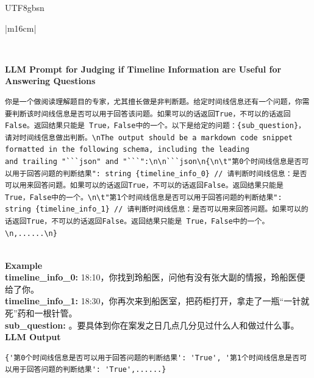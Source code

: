 \documentclass[11pt]{article}
\begin{document}
{\begin{CJK}{UTF8}{gbsn}
\begin{table}[ht!]
\begin{minipage}{\textwidth}
\begin{tabular}{|m{16cm}|}
\begin{minipage}[t]{\linewidth}
\begin{verbatim}
\end{verbatim}
\end{minipage} \\
\hline
{}  {\textbf{LLM Prompt for Judging if Timeline Information are Useful for Answering Questions}} \\
\begin{minipage}[t]{\linewidth}
\small\begin{verbatim}
你是一个做阅读理解题目的专家，尤其擅长做是非判断题。给定时间线信息还有一个问题，你需要判断该时间线信息是否可以用于回答该问题。如果可以的话返回True，不可以的话返回False。返回结果只能是 True，False中的一个。以下是给定的问题：{sub_question}，请对时间线信息做出判断。\nThe output should be a markdown code snippet formatted in the following schema, including the leading
and trailing "```json" and "```":\n\n```json\n{\n\t"第0个时间线信息是否可以用于回答问题的判断结果": string {timeline_info_0} // 请判断时间线信息：是否可以用来回答问题。如果可以的话返回True，不可以的话返回False。返回结果只能是 True，False中的一个。\n\t"第1个时间线信息是否可以用于回答问题的判断结果": string {timeline_info_1} // 请判断时间线信息：是否可以用来回答问题。如果可以的话返回True，不可以的话返回False。返回结果只能是 True，False中的一个。\n,......\n}

\end{verbatim}
\end{minipage} \\
\hline
{}  \textbf{Example}  \\
 \textbf{  timeline\_info\_0:} \small18:10，你找到玲船医，问他有没有张大副的情报，玲船医便给了你。\\
  \textbf{  timeline\_info\_1:} \small18:30，你再次来到船医室，把药柜打开，拿走了一瓶“一针就死”药和一根针管。\\
    \textbf{  sub\_question:} 。要具体到你在案发之日几点几分见过什么人和做过什么事。\\
  \textbf{LLM Output}  \\
\hline
\begin{minipage}[t]{\linewidth}
\small\begin{verbatim}
{'第0个时间线信息是否可以用于回答问题的判断结果': 'True', '第1个时间线信息是否可以用于回答问题的判断结果': 'True',......}

\end{verbatim}
\end{minipage} \\
\hline


\end{tabular}
\end{minipage}
\end{table}
\end{CJK}}
\end{document}
